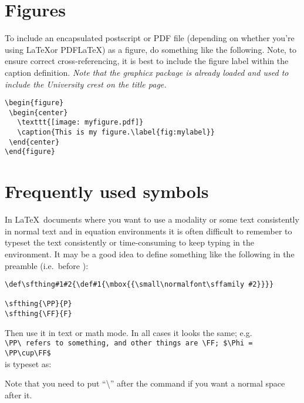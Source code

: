 \section{Figures\label{sec:figures}}

To include an encapsulated postscript or PDF file (depending on whether you're using \LaTeX or PDF\LaTeX) as a figure, do
something like the following.  Note, to ensure correct
cross-referencing, it is best to include the figure label within
the caption definition.  \emph{Note that the graphicx package 
is already loaded and used to include the
University crest on the title page.}

\begin{verbatim}
\begin{figure}
 \begin{center}
   \texttt{[image: myfigure.pdf]}    
   \caption{This is my figure.\label{fig:mylabel}}
 \end{center}
\end{figure}
\end{verbatim}

\section{Frequently used symbols\label{sec:fus}}

In \LaTeX\ documents where you want to use a modality or some text consistently in normal text and in equation environments it is often difficult to remember to typeset the text consistently or time-consuming to keep typing in the environment. It may be a good idea to define something like the following in the preamble (i.e.\ before \verb++):

\begin{verbatim}
\def\sfthing#1#2{\def#1{\mbox{{\small\normalfont\sffamily #2}}}}

\sfthing{\PP}{P}
\sfthing{\FF}{F}
\end{verbatim}

Then use it in text or math mode. In all cases it looks the same; e.g.\\
\verb+\PP\ refers to something, and other things are \FF; $\Phi = \PP\cup\FF$+\\
is typeset as:


Note that you need to put ``\textbackslash'' after the command if you want a normal space after it.


